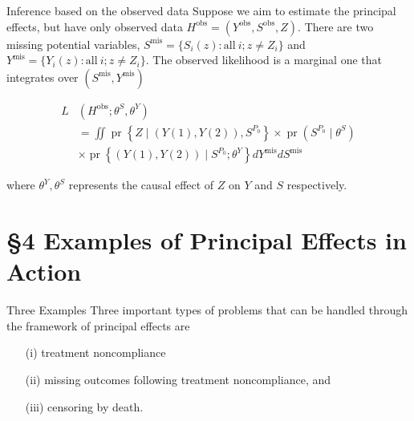 \documentclass[10pt]{beamer}
\begin{document}
\begin{frame}{Inference based on the observed data}
Suppose we aim to estimate the principal effects, but have only observed data $H^{\text{obs}} = (Y^{\text{obs}}, S^{\text{obs}}, Z)$. There are two missing potential variables, $S^{\text{mis}} = \{S_i(z): \text{all}~ i; z \ne Z_i\}$ and $Y^{\text{mis}} = \{Y_i(z): \text{all}~ i; z \ne Z_i\}$. The observed likelihood is a marginal one that integrates over $(S^{\text{mis}}, Y^{\text{mis}})$


$$
\begin{aligned}
L& \left( H^{\mathrm{obs}} ; \theta^S, \theta^Y\right) \\
& = \iint \operatorname{pr}\left\{Z \mid(Y(1), Y(2)), S^{P_0}\right\}  \times \operatorname{pr}\left(S^{P_0} \mid \theta^S\right) \\
& \times \operatorname{pr}\left\{(Y(1), Y(2)) \mid S^{P_0} ; \theta^Y\right\} d Y^{\mathrm{mis}} d S^{\mathrm{mis}}
\end{aligned}
$$

where $\theta^Y, \theta^S$ represents the causal effect of $Z$ on $Y$ and $S$ respectively.

\end{frame}

\section{\S 4 Examples of Principal Effects in Action}

\begin{frame}{Three Examples}
Three important types of problems that can be handled through the 
framework of principal effects are 

\begin{itemize}
    \item[(i)] treatment noncompliance
    \item[(ii)] missing outcomes following treatment noncompliance, and 
    \item[(iii)] censoring by death. 
\end{itemize}
\end{frame}
\end{document}
